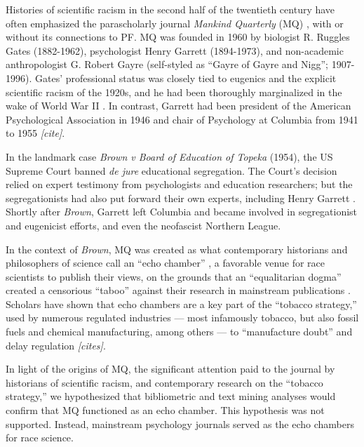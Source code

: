 \documentclass[12pt]{article}
\begin{document}
Histories of scientific racism in the second half of the twentieth century have often emphasized the parascholarly journal \emph{Mankind Quarterly} (MQ) \cite{
MehlerFoundationFascismNew1989,
WinstonScienceServiceFar1998,
SchafferScientificRacismAgain2007,
SainiSuperiorReturnRace2019,
WinstonScientificRacismNorth2020,
AdamsMisAppropriationBiological2021,
SainiDraperMillionsPhilanthropic2022
}, with or without its connections to PF. MQ was founded in 1960 by biologist R. Ruggles Gates (1882-1962), psychologist Henry Garrett (1894-1973), and non-academic anthropologist G. Robert Gayre (self-styled as ``Gayre of Gayre and Nigg''; 1907-1996). Gates' professional status was closely tied to eugenics and the explicit scientific racism of the 1920s, and he had been thoroughly marginalized in the wake of World War II \cite{WinstonScienceServiceFar1998}. In contrast, Garrett had been president of the American Psychological Association in 1946 and chair of Psychology at Columbia from 1941 to 1955 \emph{{[}cite{]}}.

In the landmark case \emph{Brown v Board of Education of Topeka} (1954), the US Supreme Court banned \emph{de jure} educational segregation. The Court's decision relied on expert testimony from psychologists and education researchers; but the segregationists had also put forward their own experts, including Henry Garrett \cite{WinstonScienceServiceFar1998, JacksonScienceSegregationRace2005, SchafferScientificRacismAgain2007}. Shortly after \emph{Brown}, Garrett left Columbia and became involved in segregationist and eugenicist efforts, and even the neofascist Northern League.

In the context of \emph{Brown}, MQ was created as what contemporary historians and philosophers of science call an ``echo chamber'' \cite{FernandezPintoKnowBetterNot2017}, a favorable venue for race scientists to publish their views, on the grounds that an ``equalitarian dogma'' created a censorious ``taboo'' against their research in mainstream publications \cite{TuckerFundingScientificRacism2002, JacksonMythicalTabooRace2020}. Scholars have shown that echo chambers are a key part of the ``tobacco strategy,'' used by numerous regulated industries --- most infamously tobacco, but also fossil fuels and chemical manufacturing, among others --- to ``manufacture doubt'' and delay regulation \emph{{[}cites{]}}.

In light of the origins of MQ, the significant attention paid to the journal by historians of scientific racism, and contemporary research on the ``tobacco strategy,'' we hypothesized that bibliometric and text mining analyses would confirm that MQ functioned as an echo chamber. This hypothesis was not supported. Instead, mainstream psychology journals served as the echo chambers for race science.
\end{document}
